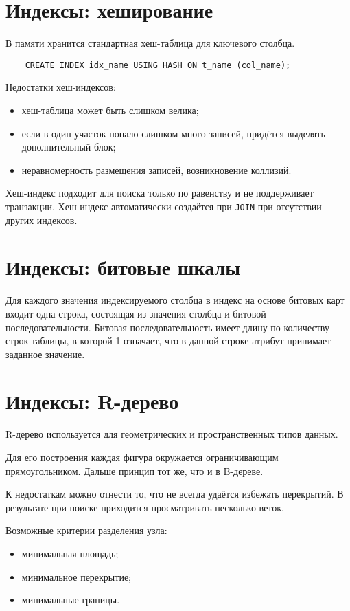 \section{Индексы: хеширование}

В памяти хранится стандартная хеш-таблица для ключевого столбца.

\begin{verbatim}
	CREATE INDEX idx_name USING HASH ON t_name (col_name);
\end{verbatim}

Недостатки хеш-индексов:
\begin{itemize}
	\item хеш-таблица может быть слишком велика;
	\item если в один участок попало слишком много записей, придётся выделять дополнительный блок;
	\item неравномерность размещения записей, возникновение коллизий.
\end{itemize}

Хеш-индекс подходит для поиска только по равенству и не поддерживает транзакции.
Хеш-индекс автоматически создаётся при \texttt{JOIN} при отсутствии других индексов.

\section{Индексы: битовые шкалы}

Для каждого значения индексируемого столбца в индекс на основе битовых карт входит одна строка, состоящая из значения столбца и битовой последовательности.
Битовая последовательность имеет длину по количеству строк таблицы, в которой 1 означает, что в данной строке атрибут принимает заданное значение.

\section{Индексы: R-дерево}

R-дерево используется для геометрических и пространственных типов данных.

Для его построения каждая фигура окружается ограничивающим прямоугольником. Дальше принцип тот же, что и в B-дереве.

К недостаткам можно отнести то, что не всегда удаётся избежать перекрытий.
В результате при поиске приходится просматривать несколько веток.

Возможные критерии разделения узла:
\begin{itemize}
	\item минимальная площадь;
	\item минимальное перекрытие;
	\item минимальные границы.
\end{itemize}

